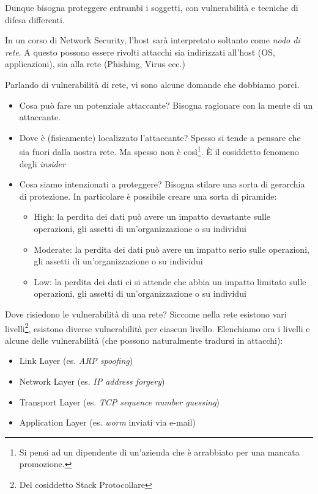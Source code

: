 \documentclass[14pt]{extreport}
\begin{document}
Dunque bisogna proteggere entrambi i soggetti, con vulnerabilità e tecniche di difesa differenti.

In un corso di Network Security, l'host sarà interpretato soltanto come \textit{nodo di rete}. A questo possono essere rivolti attacchi sia indirizzati all'host (OS, applicazioni), sia alla rete (Phishing, Virus ecc.)\newline

Parlando di vulnerabilità di rete, vi sono alcune domande che dobbiamo porci.

\begin{itemize}
    \item Cosa può fare un potenziale attaccante?
    Bisogna ragionare con la mente di un attaccante.
    \item Dove è (fisicamente) localizzato l'attaccante?
    Spesso si tende a pensare che sia fuori dalla nostra rete. Ma spesso non è così\footnote{Si pensi ad un dipendente di un'azienda che è arrabbiato per una mancata promozione.}. È il cosiddetto fenomeno degli \textit{insider}
    \item Cosa siamo intenzionati a proteggere?
    Bisogna stilare una sorta di gerarchia di protezione. In particolare è possibile creare una sorta di piramide\cite{stallings}:
    \begin{itemize}
        \item High: la perdita dei dati può avere un impatto devastante sulle operazioni, gli assetti di un'organizzazione o su individui
        \item Moderate: la perdita dei dati può avere un impatto serio sulle operazioni, gli assetti di un'organizzazione o su individui
        \item Low: la perdita dei dati ci si attende che abbia un impatto limitato sulle operazioni, gli assetti di un'organizzazione o su individui
    \end{itemize}
    
\end{itemize}

Dove risiedono le vulnerabilità di una rete? Siccome nella rete esistono vari livelli\footnote{Del cosiddetto Stack Protocollare}, esistono diverse vulnerabilità per ciascun livello. Elenchiamo ora i livelli e alcune delle vulnerabilità (che possono naturalmente tradursi in attacchi):

\begin{itemize}
    \item Link Layer (es. \textit{ARP spoofing})
    \item Network Layer (es. \textit{IP address forgery})
    \item Transport Layer (es. \textit{TCP sequence number guessing})
    \item Application Layer (es. \textit{worm} inviati via e-mail)
\end{itemize}
\end{document}
